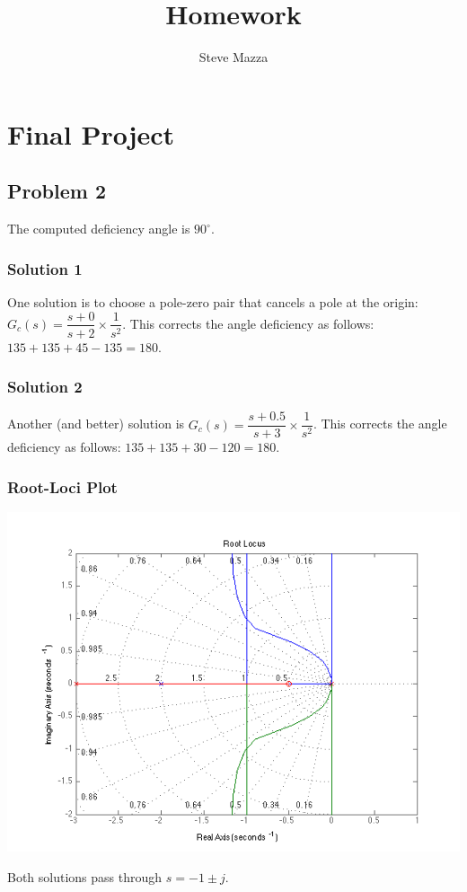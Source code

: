 \documentclass[letterpaper,10pt]{article}
\title{Homework}
\author{Steve Mazza}
\begin{document}
\maketitle

\section*{Final Project}
\subsection*{Problem 2}
The computed deficiency angle is $90^{\circ}$. 
\subsubsection*{Solution 1}
 One solution is to choose a pole-zero pair that cancels a pole at the origin: $G_{c}(s) = \dfrac{s+0}{s+2}\times\dfrac{1}{s^{2}}$.
This corrects the angle deficiency as follows: $135 + 135 + 45 - 135 = 180$.

\subsubsection*{Solution 2}
Another (and better) solution is $G_{c}(s) = \dfrac{s+0.5}{s+3}\times\dfrac{1}{s^{2}}$.
This corrects the angle deficiency as follows: $135+135+30-120=180$.

\subsubsection*{Root-Loci Plot}
\begin{center}
	\includegraphics[scale=0.75]{2-rlocus.png}
\end{center}
Both solutions pass through $s=-1\pm j$.
\end{document}
